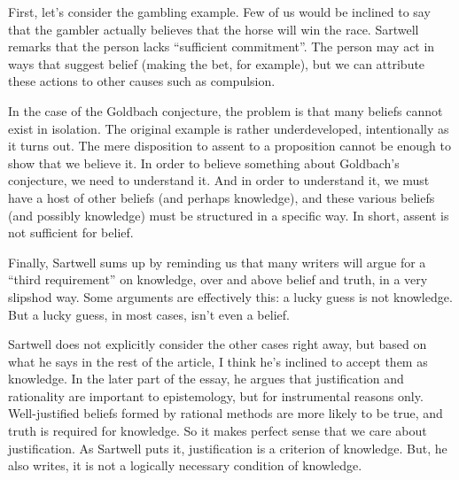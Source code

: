 First, let's consider the gambling example. Few of us would be inclined to say that the gambler actually believes that the horse will win the race. Sartwell remarks that the person lacks ``sufficient commitment''. The person may act in ways that suggest belief (making the bet, for example), but we can attribute these actions to other causes such as compulsion.

In the case of the Goldbach conjecture, the problem is that many beliefs cannot exist in isolation. The original example is rather underdeveloped, intentionally as it turns out. The mere disposition to assent to a proposition cannot be enough to show that we believe it. In order to believe something about Goldbach's conjecture, we need to understand it. And in order to understand it, we must have a host of other beliefs (and perhaps knowledge), and these various beliefs (and possibly knowledge) must be structured in a specific way. In short, assent is not sufficient for belief.

Finally, Sartwell sums up by reminding us that many writers will argue for a ``third requirement'' on knowledge, over and above belief and truth, in a very slipshod way. Some arguments are effectively this: a lucky guess is not knowledge. But a lucky guess, in most cases, isn't even a belief.

Sartwell does not explicitly consider the other cases right away, but based on what he says in the rest of the article, I think he's inclined to accept them as knowledge. In the later part of the essay, he argues that justification and rationality are important to epistemology, but for instrumental reasons only. Well-justified beliefs formed by rational methods are more likely to be true, and truth is required for knowledge. So it makes perfect sense that we care about justification. As Sartwell puts it, justification is a criterion of knowledge. But, he also writes, it is not a logically necessary condition of knowledge.
